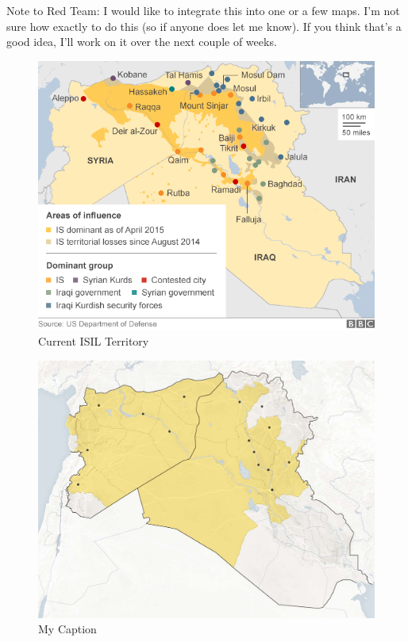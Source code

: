 \documentclass{report}
\begin{document}
Note to Red Team: I would like to integrate this into one or a few maps. I'm not sure how exactly to do this (so if anyone does let me know). If you think that's a good idea, I'll work on it over the next couple of weeks.



\begin{figure}[h]
 \centering
 \includegraphics[trim = 0cm 0cm 0cm 0cm, clip,scale=0.6]{./figures/current_territory.png}
   \caption{Current ISIL Territory}
     \label{fig:current_territory}
\end{figure}



\begin{figure}[H]
 \centering
 \includegraphics[trim = 0cm 0cm 0cm 0cm, clip,scale=0.3]{./figures/current2.png}
   \caption{My Caption \cite{Lewis2014}}
     \label{fig:current2}
\end{figure}
\end{document}
